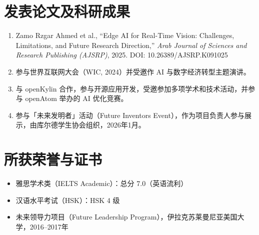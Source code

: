 \section*{发表论文及科研成果}

\begin{enumerate}
  \item Zamo Rzgar Ahmed et al., ``Edge AI for Real-Time Vision: Challenges, Limitations, and Future Research Direction,'' \textit{Arab Journal of Sciences and Research Publishing (AJSRP)}, 2025. DOI: 10.26389/AJSRP.K091025

  \item 参与世界互联网大会（WIC, 2024）并受邀作 AI 与数字经济转型主题演讲。

  \item 与 openKylin 合作，参与开源应用开发，受邀参加多项学术和技术活动，并参与 openAtom 举办的 AI 优化竞赛。

  \item 参与「未来发明者」活动（Future Inventors Event），作为项目负责人参与展示，由库尔德学生协会组织，2026年1月。
\end{enumerate}

\section*{所获荣誉与证书}

\begin{itemize}
  \item 雅思学术类（IELTS Academic）：总分 7.0（英语流利）
  \item 汉语水平考试（HSK）：HSK 4 级
  \item 未来领导力项目（Future Leadership Program），伊拉克苏莱曼尼亚美国大学，2016--2017年
\end{itemize}
